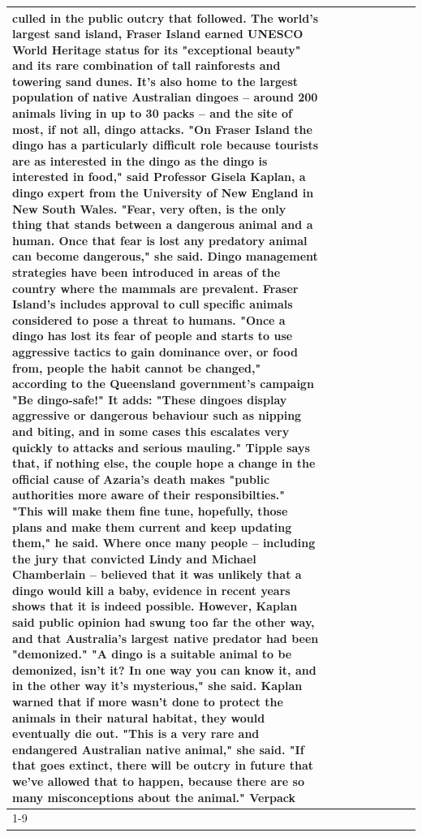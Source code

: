 \begin{table}[H]
\begin{tabular}{lllrlllll}
culled in the public outcry that followed. The world's largest sand island, Fraser Island earned UNESCO World Heritage status for its "exceptional beauty" and its rare combination of tall rainforests and towering sand dunes. It's also home to the largest population of native Australian dingoes -- around 200 animals living in up to 30 packs -- and the site of most, if not all, dingo attacks. "On Fraser Island the dingo has a particularly difficult role because tourists are as interested in the dingo as the dingo is interested in food," said Professor Gisela Kaplan, a dingo expert from the University of New England in New South Wales. "Fear, very often, is the only thing that stands between a dangerous animal and a human. Once that fear is lost any predatory animal can become dangerous," she said. Dingo management strategies have been introduced in areas of the country where the mammals are prevalent. Fraser Island's includes approval to cull specific animals considered to pose a threat to humans. "Once a dingo has lost its fear of people and starts to use aggressive tactics to gain dominance over, or food from, people the habit cannot be changed," according to the Queensland government's campaign "Be dingo-safe!" It adds: "These dingoes display aggressive or dangerous behaviour such as nipping and biting, and in some cases this escalates very quickly to attacks and serious mauling." Tipple says that, if nothing else, the couple hope a change in the official cause of Azaria's death makes "public authorities more aware of their responsibilties." "This will make them fine tune, hopefully, those plans and make them current and keep updating them," he said. Where once many people -- including the jury that convicted Lindy and Michael Chamberlain -- believed that it was unlikely that a dingo would kill a baby, evidence in recent years shows that it is indeed possible. However, Kaplan said public opinion had swung too far the other way, and that Australia's largest native predator had been "demonized." "A dingo is a suitable animal to be demonized, isn't it? In one way you can know it, and in the other way it's mysterious," she said. Kaplan warned that if more wasn't done to protect the animals in their natural habitat, they would eventually die out. "This is a very rare and endangered Australian native animal," she said. "If that goes extinct, there will be outcry in future that we've allowed that to happen, because there are so many misconceptions about the animal." Verpack \\
\cline{1-9}

\end{tabular}
\end{table}
